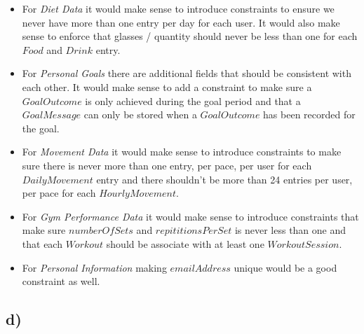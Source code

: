 \documentclass{article}
\begin{document}
\begin{itemize}
  \item For {\em Diet Data} it would make sense to introduce constraints to ensure we never have more than one entry per day for each user. It would also make sense to enforce that glasses / quantity should never be less than one for each $Food$ and $Drink$ entry.
  \item For {\em Personal Goals} there are additional fields that should be consistent with each other. It would make sense to add a constraint to make sure a $GoalOutcome$ is only achieved during the goal period and that a $GoalMessage$ can only be stored when a $GoalOutcome$ has been recorded for the goal.
  \item For {\em Movement Data} it would make sense to introduce constraints to make sure there is never more than one entry, per pace, per user for each $DailyMovement$ entry and there shouldn't be more than 24 entries per user, per pace for each $HourlyMovement$. 
  \item For {\em Gym Performance Data} it would make sense to introduce constraints that make sure $numberOfSets$ and $repititionsPerSet$ is never less than one and that each $Workout$ should be associate with at least one $WorkoutSession$.
  \item For {\em Personal Information} making $emailAddress$ unique would be a good constraint as well.
\end{itemize}

\subsection*{\small d)}
\end{document}
